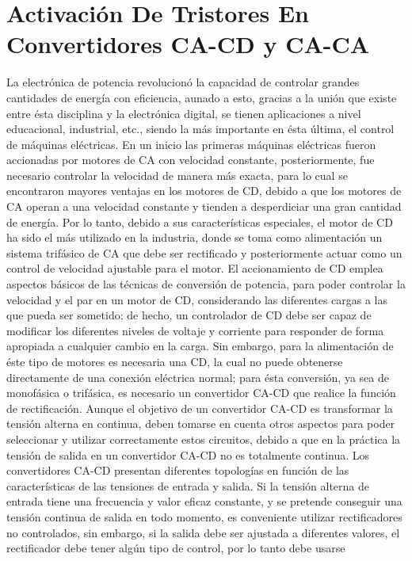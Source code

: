 \documentclass[10pt,a4paper]{article}
\begin{document}
\section{Activación De Tristores En Convertidores CA-CD y CA-CA}
La electrónica de potencia revolucionó la capacidad de controlar grandes cantidades de
energía con eficiencia, aunado a esto, gracias a la unión que existe entre ésta disciplina
y la electrónica digital, se tienen aplicaciones a nivel educacional, industrial, etc., siendo
la más importante en ésta última, el control de máquinas eléctricas.
En un inicio las primeras máquinas eléctricas fueron accionadas por motores de CA con
velocidad constante, posteriormente, fue necesario controlar la velocidad de manera más
exacta, para lo cual se encontraron mayores ventajas en los motores de CD, debido a
que los motores de CA operan a una velocidad constante y tienden a desperdiciar una
gran cantidad de energía. Por lo tanto, debido a sus características especiales, el motor
de CD ha sido el más utilizado en la industria, donde se toma como alimentación un
sistema trifásico de CA que debe ser rectificado y posteriormente actuar como un control
de velocidad ajustable para el motor. El accionamiento de CD emplea aspectos básicos
de las técnicas de conversión de potencia, para poder controlar la velocidad y el par en
un motor de CD, considerando las diferentes cargas a las que pueda ser sometido; de
hecho, un controlador de CD debe ser capaz de modificar los diferentes niveles de voltaje
y corriente para responder de forma apropiada a cualquier cambio en la carga.
Sin embargo, para la alimentación de éste tipo de motores es necesaria una CD, la cual
no puede obtenerse directamente de una conexión eléctrica normal; para ésta
conversión, ya sea de monofásica o trifásica, es necesario un convertidor CA-CD que
realice la función de rectificación.
Aunque el objetivo de un convertidor CA-CD es transformar la tensión alterna en continua,
deben tomarse en cuenta otros aspectos para poder seleccionar y utilizar correctamente
estos circuitos, debido a que en la práctica la tensión de salida en un convertidor CA-CD
no es totalmente continua. Los convertidores CA-CD presentan diferentes topologías en
función de las características de las tensiones de entrada y salida.
Si la tensión alterna de entrada tiene una frecuencia y valor eficaz constante, y se
pretende conseguir una tensión continua de salida en todo momento, es conveniente utilizar rectificadores no controlados, sin embargo, si la salida debe ser ajustada a
diferentes valores, el rectificador debe tener algún tipo de control, por lo tanto debe usarse
\end{document}

